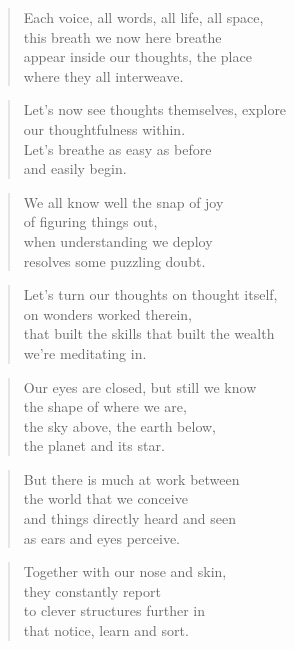 \documentclass[10pt,a4paper]{article}
\begin{document}
\begin{multicols}{2}


\begin{verse}
Each voice, all words, all life, all space,\\
this breath we now here breathe\\
appear inside our thoughts, the place\\
where they all interweave.
\end{verse}

\begin{verse}
Let’s now see thoughts themselves, explore\\
our thoughtfulness within.\\
Let’s breathe as easy as before\\
and easily begin.
\end{verse}

\begin{verse}
We all know well the snap of joy\\
of figuring things out,\\
when understanding we deploy\\
resolves some puzzling doubt.
\end{verse}

\begin{verse}
Let’s turn our thoughts on thought itself,\\
on wonders worked therein,\\
that built the skills that built the wealth\\
we’re meditating in.
\end{verse}

\begin{verse}
Our eyes are closed, but still we know\\
the shape of where we are,\\
the sky above, the earth below,\\
the planet and its star.
\end{verse}

\begin{verse}
But there is much at work between\\
the world that we conceive\\
and things directly heard and seen\\
as ears and eyes perceive.
\end{verse}

\begin{verse}
Together with our nose and skin,\\
they constantly report\\
to clever structures further in\\
that notice, learn and sort.
\end{verse}


\end{multicols}
\end{document}
